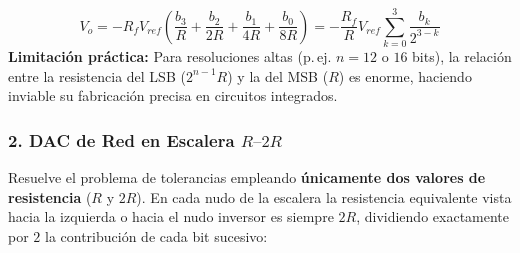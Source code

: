 \begin{center}
\end{center}

\begin{equation}
    V_o = -R_f V_{ref} \left(\frac{b_3}{R} + \frac{b_2}{2R} + \frac{b_1}{4R} + \frac{b_0}{8R}\right) = -\frac{R_f}{R} V_{ref} \sum_{k=0}^{3} \frac{b_k}{2^{3-k}}
\end{equation}
\textbf{Limitación práctica:} Para resoluciones altas (p.\,ej. $n = 12$ o $16$ bits), la relación entre la resistencia del LSB ($2^{n-1}R$) y la del MSB ($R$) es enorme, haciendo inviable su fabricación precisa en circuitos integrados.

\subsubsection{2. DAC de Red en Escalera $R\text{--}2R$}
Resuelve el problema de tolerancias empleando \textbf{únicamente dos valores de resistencia} ($R$ y $2R$). En cada nudo de la escalera la resistencia equivalente vista hacia la izquierda o hacia el nudo inversor es siempre $2R$, dividiendo exactamente por $2$ la contribución de cada bit sucesivo:


